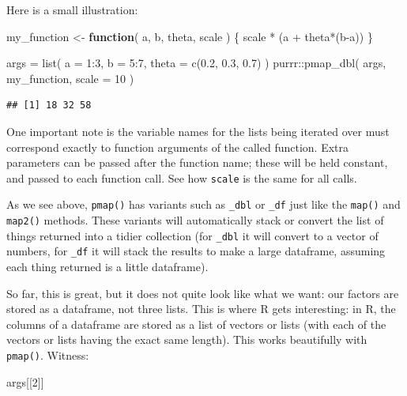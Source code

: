 \documentclass[
]{book}
\newenvironment{Shaded}{\begin{snugshade}}{\end{snugshade}}
\newcommand{\AttributeTok}[1]{\textcolor[rgb]{0.77,0.63,0.00}{#1}}
\newcommand{\ControlFlowTok}[1]{\textcolor[rgb]{0.13,0.29,0.53}{\textbf{#1}}}
\newcommand{\DecValTok}[1]{\textcolor[rgb]{0.00,0.00,0.81}{#1}}
\newcommand{\FloatTok}[1]{\textcolor[rgb]{0.00,0.00,0.81}{#1}}
\newcommand{\FunctionTok}[1]{\textcolor[rgb]{0.00,0.00,0.00}{#1}}
\newcommand{\NormalTok}[1]{#1}
\newcommand{\OtherTok}[1]{\textcolor[rgb]{0.56,0.35,0.01}{#1}}
\newcommand{\SpecialCharTok}[1]{\textcolor[rgb]{0.00,0.00,0.00}{#1}}
\begin{document}
Here is a small illustration:

\begin{Shaded}
\begin{Highlighting}[]
\NormalTok{my\_function }\OtherTok{\textless{}{-}} \ControlFlowTok{function}\NormalTok{( a, b, theta, scale ) \{}
\NormalTok{    scale }\SpecialCharTok{*}\NormalTok{ (a }\SpecialCharTok{+}\NormalTok{ theta}\SpecialCharTok{*}\NormalTok{(b}\SpecialCharTok{{-}}\NormalTok{a))}
\NormalTok{\}}

\NormalTok{args }\OtherTok{=} \FunctionTok{list}\NormalTok{( }\AttributeTok{a =} \DecValTok{1}\SpecialCharTok{:}\DecValTok{3}\NormalTok{, }
             \AttributeTok{b =} \DecValTok{5}\SpecialCharTok{:}\DecValTok{7}\NormalTok{, }
             \AttributeTok{theta =} \FunctionTok{c}\NormalTok{(}\FloatTok{0.2}\NormalTok{, }\FloatTok{0.3}\NormalTok{, }\FloatTok{0.7}\NormalTok{) )}
\NormalTok{purrr}\SpecialCharTok{::}\FunctionTok{pmap\_dbl}\NormalTok{(  args, my\_function, }\AttributeTok{scale =} \DecValTok{10}\NormalTok{ )}
\end{Highlighting}
\end{Shaded}

\begin{verbatim}
## [1] 18 32 58
\end{verbatim}

One important note is the variable names for the lists being iterated over must correspond exactly to function arguments of the called function.
Extra parameters can be passed after the function name; these will be held constant, and passed to each function call.
See how \texttt{scale} is the same for all calls.

As we see above, \texttt{pmap()} has variants such as \texttt{\_dbl} or \texttt{\_df} just like the \texttt{map()} and \texttt{map2()} methods.
These variants will automatically stack or convert the list of things returned into a tidier collection (for \texttt{\_dbl} it will convert to a vector of numbers, for \texttt{\_df} it will stack the results to make a large dataframe, assuming each thing returned is a little dataframe).

So far, this is great, but it does not quite look like what we want: our factors are stored as a dataframe, not three lists.
This is where R gets interesting: in R, the columns of a dataframe are stored as a list of vectors or lists (with each of the vectors or lists having the exact same length).
This works beautifully with \texttt{pmap()}.
Witness:

\begin{Shaded}
\begin{Highlighting}[]
\NormalTok{args[[}\DecValTok{2}\NormalTok{]]}
\end{Highlighting}
\end{Shaded}
\end{document}
